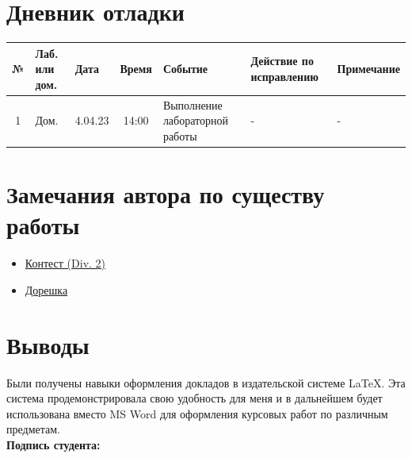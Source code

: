 \documentclass[12pt, letterpaper]{article}
\begin{document}
\section{Дневник отладки}
\begin{tabular}{|c|p{1cm}|p{1.5cm}|c|p{2.5cm}|p{2cm}|p{2.25cm}|}
    \hline
    № & Лаб. или дом. & Дата & Время & Событие & Действие по исправлению & Примечание\\
    \hline
    1 & Дом. & 4.04.23 & 14:00 & Выполнение лабораторной работы & - & -\\
    \hline
\end{tabular}
\section{Замечания автора по существу работы}
\begin{itemize}
\item \href{https://codeforces.com/contest/1808/submission/199664376}{Контест (Div. 2)}
\item \href{https://codeforces.com/contest/1808/submission/200104090}{Дорешка}
\end{itemize}
\section{Выводы}
Были получены навыки оформления докладов в издательской системе \LaTeX{}. Эта система продемонстрировала свою удобность для меня и в дальнейшем будет использована вместо MS Word для оформления курсовых работ по различным предметам. \\
\flushright \textbf{Подпись студента:} \underline{\hspace{3cm}}
\end{document}
